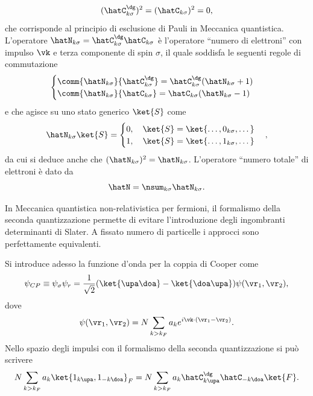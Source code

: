 \begin{equation}
    (\hatC^\dg_{k\sigma})^2 = (\hatC_{k\sigma})^2 = 0,
\end{equation}
che corrisponde al principio di esclusione di Pauli in Meccanica quantistica. L'operatore $\hatN_{k\sigma} = \hatC^\dg_{k\sigma}\hatC_{k\sigma}$ è l'operatore ``numero di elettroni'' con impulso $\vk$ e terza componente di spin $\sigma$, il quale soddisfa le seguenti regole di commutazione
\begin{equation}
    \begin{cases}
        \comm{\hatN_{k\sigma}}{\hatC^\dg_{k\sigma}} = \hatC^\dg_{k\sigma}(\hatN_{k\sigma} + 1) \\
        \comm{\hatN_{k\sigma}}{\hatC_{k\sigma}} = \hatC_{k\sigma}(\hatN_{k\sigma} - 1)
    \end{cases}
\end{equation}
e che agisce su uno stato generico $\ket{S}$ come
\begin{equation}
    \hatN_{k\sigma}\ket{S} = 
    \begin{cases}
        0,\quad \ket{S} = \ket{\dots,0_{k\sigma},\dots} \\
        1,\quad \ket{S} = \ket{\dots,1_{k\sigma},\dots}
    \end{cases},
\end{equation}
da cui si deduce anche che $(\hatN_{k\sigma})^2 = \hatN_{k\sigma}$. L'operatore ``numero totale'' di elettroni è dato da
\begin{equation}
    \hatN = \nsum_{k\sigma}\hatN_{k\sigma}.
\end{equation}
\begin{obs}
    In Meccanica quantistica non-relativistica per fermioni, il formalismo della seconda quantizzazione permette di evitare l'introduzione degli ingombranti determinanti di Slater. A fissato numero di particelle i approcci sono perfettamente equivalenti.
\end{obs}
Si introduce adesso la funzione d'onda per la coppia di Cooper come
\begin{equation}
    \psi_{CP} \equiv \psi_\sigma\psi_r = \frac{1}{\sqrt{2}}(\ket{\upa\doa} - \ket{\doa\upa})\psi(\vr_1,\vr_2),
\end{equation}
dove
\begin{equation}
    \psi(\vr_1,\vr_2) = N\sum_{k > k_F}a_ke^{i\vk\cdot(\vr_1 - \vr_2)}.
\end{equation}
Nello spazio degli impulsi con il formalismo della seconda quantizzazione si può scrivere
\begin{equation}
    N\sum_{k > k_F}a_k\ket{1_{k\upa},1_{-k\doa}}_F = N\sum_{k > k_F}a_k\hatC^\dg_{k\upa}\hatC_{-k\doa}\ket{F}.
\end{equation}
